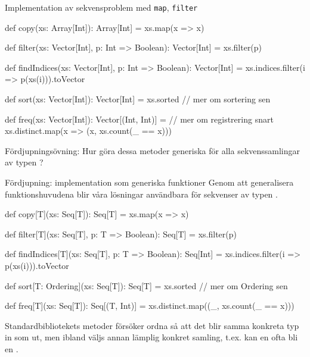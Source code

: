 \begin{Slide}{Implementation av sekvensproblem med \texttt{map}, \texttt{filter}}
\begin{Code}
def copy(xs: Array[Int]): Array[Int] = xs.map(x => x)

def filter(xs: Vector[Int], p: Int => Boolean): Vector[Int] = xs.filter(p)

def findIndices(xs: Vector[Int], p: Int => Boolean): Vector[Int] =
  xs.indices.filter(i => p(xs(i))).toVector

def sort(xs: Vector[Int]): Vector[Int] = xs.sorted // mer om sortering sen

def freq(xs: Vector[Int]): Vector[(Int, Int)] = // mer om registrering snart
  xs.distinct.map(x => (x, xs.count(_ == x)))
\end{Code}
Fördjupningsövning: Hur göra dessa metoder generiska för alla sekvenssamlingar av typen ?
\end{Slide}


\begin{Slide}{Fördjupning: implementation som generiska funktioner}
Genom att generalisera funktionshuvudena blir våra lösningar användbara för  sekvenser av typen .
\begin{Code}
def copy[T](xs: Seq[T]): Seq[T] = xs.map(x => x)

def filter[T](xs: Seq[T], p: T => Boolean): Seq[T] = xs.filter(p)

def findIndices[T](xs: Seq[T], p: T => Boolean): Seq[Int] =
  xs.indices.filter(i => p(xs(i))).toVector

def sort[T: Ordering](xs: Seq[T]): Seq[T] = xs.sorted // mer om Ordering sen

def freq[T](xs: Seq[T]): Seq[(T, Int)] =
  xs.distinct.map((_, xs.count(_ == x)))
\end{Code}
\pause
Standardbibliotekets metoder försöker ordna så att det blir samma konkreta typ in som ut, men ibland väljs annan lämplig konkret samling, t.ex. kan en  ofta bli en .
\end{Slide}
